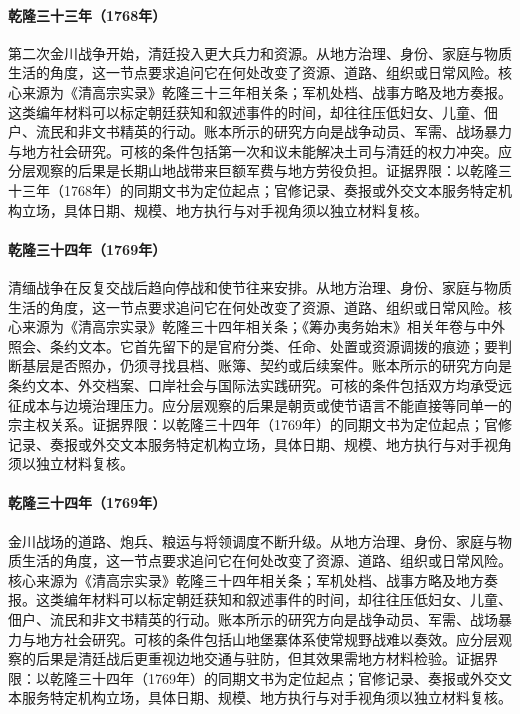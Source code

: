\hypertarget{social:EQ-1768-SECOND-JINCHUAN-WAR}{}\paragraph{乾隆三十三年（1768年）}第二次金川战争开始，清廷投入更大兵力和资源。从地方治理、身份、家庭与物质生活的角度，这一节点要求追问它在何处改变了资源、道路、组织或日常风险。核心来源为《清高宗实录》乾隆三十三年相关条；军机处档、战事方略及地方奏报。这类编年材料可以标定朝廷获知和叙述事件的时间，却往往压低妇女、儿童、佃户、流民和非文书精英的行动。账本所示的研究方向是战争动员、军需、战场暴力与地方社会研究。可核的条件包括第一次和议未能解决土司与清廷的权力冲突。应分层观察的后果是长期山地战带来巨额军费与地方劳役负担。证据界限：以乾隆三十三年（1768年）的同期文书为定位起点；官修记录、奏报或外交文本服务特定机构立场，具体日期、规模、地方执行与对手视角须以独立材料复核。
\hypertarget{social:EQ-1769-BURMA-SETTLEMENT}{}\paragraph{乾隆三十四年（1769年）}清缅战争在反复交战后趋向停战和使节往来安排。从地方治理、身份、家庭与物质生活的角度，这一节点要求追问它在何处改变了资源、道路、组织或日常风险。核心来源为《清高宗实录》乾隆三十四年相关条；《筹办夷务始末》相关年卷与中外照会、条约文本。它首先留下的是官府分类、任命、处置或资源调拨的痕迹；要判断基层是否照办，仍须寻找县档、账簿、契约或后续案件。账本所示的研究方向是条约文本、外交档案、口岸社会与国际法实践研究。可核的条件包括双方均承受远征成本与边境治理压力。应分层观察的后果是朝贡或使节语言不能直接等同单一的宗主权关系。证据界限：以乾隆三十四年（1769年）的同期文书为定位起点；官修记录、奏报或外交文本服务特定机构立场，具体日期、规模、地方执行与对手视角须以独立材料复核。
\hypertarget{social:EQ-1769-JINCHUAN-ESCALATION}{}\paragraph{乾隆三十四年（1769年）}金川战场的道路、炮兵、粮运与将领调度不断升级。从地方治理、身份、家庭与物质生活的角度，这一节点要求追问它在何处改变了资源、道路、组织或日常风险。核心来源为《清高宗实录》乾隆三十四年相关条；军机处档、战事方略及地方奏报。这类编年材料可以标定朝廷获知和叙述事件的时间，却往往压低妇女、儿童、佃户、流民和非文书精英的行动。账本所示的研究方向是战争动员、军需、战场暴力与地方社会研究。可核的条件包括山地堡寨体系使常规野战难以奏效。应分层观察的后果是清廷战后更重视边地交通与驻防，但其效果需地方材料检验。证据界限：以乾隆三十四年（1769年）的同期文书为定位起点；官修记录、奏报或外交文本服务特定机构立场，具体日期、规模、地方执行与对手视角须以独立材料复核。
